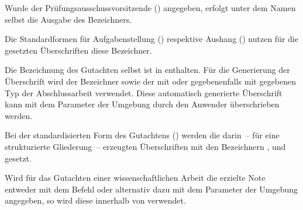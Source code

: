 \begin{DeclareEntity}{}
\begin{Declaration}
  {}
\printdeclarationlist
%
Wurde der Prüfungsausschussvorsitzende () angegeben, erfolgt 
unter dem Namen selbst die Ausgabe des Bezeichners.
\TermTable%
\end{Declaration}

\begin{Declaration}
  {}
\begin{Declaration}
  {}
\printdeclarationlist
%
Die Standardformen für Aufgabenstellung () respektive Aushang 
() nutzen für die gesetzten Überschriften diese Bezeichner.
\TermTable%
\end{Declaration}
\end{Declaration}

\begin{Declaration}
  {}
\begin{Declaration}
  {}
\printdeclarationlist
%
Die Bezeichnung des Gutachten selbst ist in  enthalten. 
Für die Generierung der Überschrift wird der Bezeichner  
sowie der mit  oder gegebenenfalls mit  gegebenen 
Typ der Abschlussarbeit verwendet. Diese automatisch generierte Überschrift 
kann mit dem Parameter  der Umgebung 
 durch den Anwender überschrieben werden.
\TermTable%
\end{Declaration}
\end{Declaration}

\begin{Declaration}
  {}
\begin{Declaration}
  {}
\printdeclarationlist
%
Bei der standardisierten Form des Gutachtens () werden 
die darin~-- für eine strukturierte Gliederung~-- erzeugten Überschriften mit 
den Bezeichnern ,  und  
gesetzt.
\TermTable%
\end{Declaration}
\end{Declaration}

\begin{Declaration}
  {}
\printdeclarationlist
%
Wird für das Gutachten einer wissenschaftlichen Arbeit die erzielte Note 
entweder mit dem Befehl  oder alternativ dazu 
mit dem Parameter  der Umgebung 
 angegeben, so wird diese innerhalb von 
 verwendet.
\TermTable[.8\textwidth]%
\end{Declaration}


\end{DeclareEntity}
